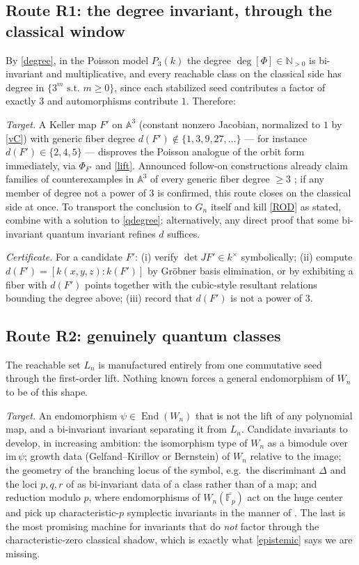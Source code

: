 \documentclass[11pt]{article}
\theoremstyle{change}
\theoremstyle{nonumberplain}
\numberwithin{equation}{section}
\newcommand\NN{{\mathbb N}}
\newcommand\st{{\textrm{ s.t.\ }}}
\newcommand\setof[1]{\{ #1 \}}
\DeclareMathOperator{\End}{End}
\begin{document}
\subsection{Route R1: the degree invariant, through the classical window}

By \cref{degree}, in the Poisson model $P_3(k)$ the degree $\deg[\Phi] \in \NN_{>0}$ is bi-invariant and multiplicative, and every reachable class on the classical side has degree in $\setof{3^m \st m \geq 0}$, since each stabilized seed contributes a factor of exactly $3$ and automorphisms contribute $1$. Therefore:

\emph{Target.} A Keller map $F'$ on $\mathbb{A}^3$ (constant nonzero Jacobian, normalized to $1$ by \cref{vC}) with generic fiber degree $d(F') \notin \setof{1, 3, 9, 27, \dots}$ --- for instance $d(F') \in \setof{2, 4, 5}$ --- disproves the Poisson analogue of the orbit form immediately, via $\Phi_{F'}$ and \cref{lift}. Announced follow-on constructions already claim families of counterexamples in $\mathbb{A}^3$ of every generic fiber degree $\geq 3$ \cite{fam}; if any member of degree not a power of $3$ is confirmed, this route closes on the classical side at once. To transport the conclusion to $G_n$ itself and kill \cref{ROD} as stated, combine with a solution to \cref{qdegree}; alternatively, any direct proof that some bi-invariant quantum invariant refines $d$ suffices.

\emph{Certificate.} For a candidate $F'$: (i) verify $\det JF' \in k^\times$ symbolically; (ii) compute $d(F') = [k(x,y,z):k(F')]$ by Gr\"obner basis elimination, or by exhibiting a fiber with $d(F')$ points together with the cubic-style resultant relations bounding the degree above; (iii) record that $d(F')$ is not a power of $3$.

\subsection{Route R2: genuinely quantum classes}

The reachable set $L_n$ is manufactured entirely from one commutative seed through the first-order lift. Nothing known forces a general endomorphism of $W_n$ to be of this shape.

\emph{Target.} An endomorphism $\psi \in \End(W_n)$ that is not the lift of any polynomial map, and a bi-invariant invariant separating it from $L_n$. Candidate invariants to develop, in increasing ambition: the isomorphism type of $W_n$ as a bimodule over $\text{im}\,\psi$; growth data (Gelfand--Kirillov or Bernstein) of $W_n$ relative to the image; the geometry of the branching locus of the symbol, e.g.\ the discriminant $\Delta$ and the loci $p, q, r$ of \cite{Speyer} as bi-invariant data of a class rather than of a map; and reduction modulo $p$, where endomorphisms of $W_n(\overline{\mathbb{F}_p})$ act on the huge center and pick up characteristic-$p$ symplectic invariants in the manner of \cite{BKK, Tsu}. The last is the most promising machine for invariants that do \emph{not} factor through the characteristic-zero classical shadow, which is exactly what \cref{epistemic} says we are missing.
\end{document}
